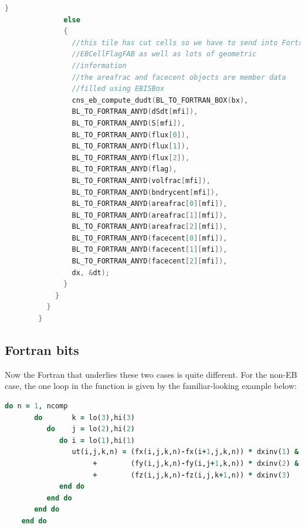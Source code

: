 \begin{lstlisting}[language=cpp]
              }
              else
              {
                //this tile has cut cells so we have to send into Fortran
                //EBCellFlagFAB as well as lots of geometric
                //information
                //the areafrac and facecent objects are member data
                //filled using EBISBox
                cns_eb_compute_dudt(BL_TO_FORTRAN_BOX(bx),
                BL_TO_FORTRAN_ANYD(dSdt[mfi]),
                BL_TO_FORTRAN_ANYD(S[mfi]),
                BL_TO_FORTRAN_ANYD(flux[0]),
                BL_TO_FORTRAN_ANYD(flux[1]),
                BL_TO_FORTRAN_ANYD(flux[2]),
                BL_TO_FORTRAN_ANYD(flag),
                BL_TO_FORTRAN_ANYD(volfrac[mfi]),
                BL_TO_FORTRAN_ANYD(bndrycent[mfi]),
                BL_TO_FORTRAN_ANYD(areafrac[0][mfi]),
                BL_TO_FORTRAN_ANYD(areafrac[1][mfi]),
                BL_TO_FORTRAN_ANYD(areafrac[2][mfi]),
                BL_TO_FORTRAN_ANYD(facecent[0][mfi]),
                BL_TO_FORTRAN_ANYD(facecent[1][mfi]),
                BL_TO_FORTRAN_ANYD(facecent[2][mfi]),
                dx, &dt);
              }
            }
          }
        }

\end{lstlisting}

\subsection{Fortran bits}

Now the Fortran that underlies these two cases is quite different.
For the non-EB case,    the one loop in the function is given by the
familiar-looking example below:
\begin{lstlisting}[language=Fortran]
    do n = 1, ncomp
       do       k = lo(3),hi(3)
          do    j = lo(2),hi(2)
             do i = lo(1),hi(1)
                ut(i,j,k,n) = (fx(i,j,k,n)-fx(i+1,j,k,n)) * dxinv(1) &
                     +        (fy(i,j,k,n)-fy(i,j+1,k,n)) * dxinv(2) &
                     +        (fz(i,j,k,n)-fz(i,j,k+1,n)) * dxinv(3)
             end do
          end do
       end do
    end do
\end{lstlisting}

